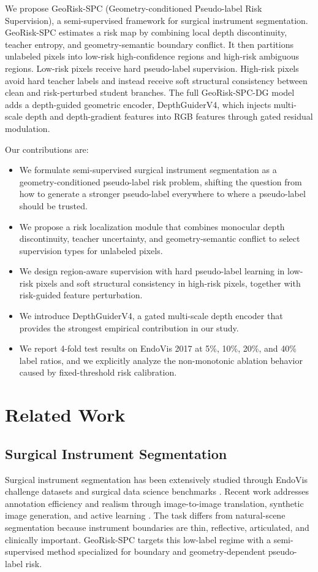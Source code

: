 \documentclass[journal]{IEEEtran}
\begin{document}
We propose GeoRisk-SPC (Geometry-conditioned Pseudo-label Risk Supervision), a semi-supervised framework for surgical instrument segmentation. GeoRisk-SPC estimates a risk map by combining local depth discontinuity, teacher entropy, and geometry-semantic boundary conflict. It then partitions unlabeled pixels into low-risk high-confidence regions and high-risk ambiguous regions. Low-risk pixels receive hard pseudo-label supervision. High-risk pixels avoid hard teacher labels and instead receive soft structural consistency between clean and risk-perturbed student branches. The full GeoRisk-SPC-DG model adds a depth-guided geometric encoder, DepthGuiderV4, which injects multi-scale depth and depth-gradient features into RGB features through gated residual modulation.

Our contributions are:
\begin{itemize}
\item We formulate semi-supervised surgical instrument segmentation as a geometry-conditioned pseudo-label risk problem, shifting the question from how to generate a stronger pseudo-label everywhere to where a pseudo-label should be trusted.
\item We propose a risk localization module that combines monocular depth discontinuity, teacher uncertainty, and geometry-semantic conflict to select supervision types for unlabeled pixels.
\item We design region-aware supervision with hard pseudo-label learning in low-risk pixels and soft structural consistency in high-risk pixels, together with risk-guided feature perturbation.
\item We introduce DepthGuiderV4, a gated multi-scale depth encoder that provides the strongest empirical contribution in our study.
\item We report 4-fold test results on EndoVis 2017 at 5\%, 10\%, 20\%, and 40\% label ratios, and we explicitly analyze the non-monotonic ablation behavior caused by fixed-threshold risk calibration.
\end{itemize}

\section{Related Work}
\subsection{Surgical Instrument Segmentation}
Surgical instrument segmentation has been extensively studied through EndoVis challenge datasets and surgical data science benchmarks \cite{maierhein2017surgical,allan20192017,rueckert2024methods}. Recent work addresses annotation efficiency and realism through image-to-image translation, synthetic image generation, and active learning \cite{colleoni2021translation,peng2024reducing,colleoni2024guided}. The task differs from natural-scene segmentation because instrument boundaries are thin, reflective, articulated, and clinically important. GeoRisk-SPC targets this low-label regime with a semi-supervised method specialized for boundary and geometry-dependent pseudo-label risk.
\end{document}
